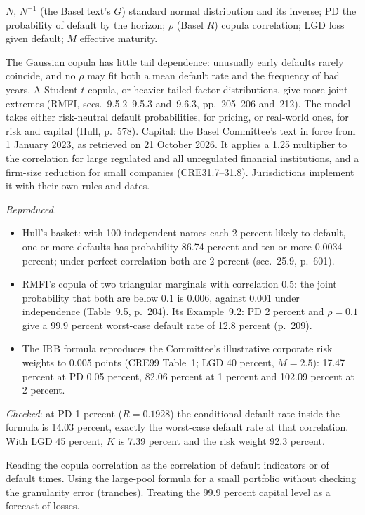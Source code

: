 \begin{qfmodel}
 $N$, $N^{-1}$ (the Basel text's $G$) standard normal distribution and its inverse; PD the probability of default by the horizon; $\rho$ (Basel $R$) copula correlation; LGD loss given default; $M$ effective maturity.

 The Gaussian copula has little tail dependence: unusually early defaults rarely coincide, and no $\rho$ may fit both a mean default rate and the frequency of bad years. A Student $t$ copula, or heavier-tailed factor distributions, give more joint extremes (RMFI, secs.~9.5.2--9.5.3 and~9.6.3, pp.~205--206 and~212). The model takes either risk-neutral default probabilities, for pricing, or real-world ones, for risk and capital (Hull, p.~578). Capital: the Basel Committee's text in force from 1 January 2023, as retrieved on 21 October 2026. It applies a 1.25 multiplier to the correlation for large regulated and all unregulated financial institutions, and a firm-size reduction for small companies (CRE31.7--31.8). Jurisdictions implement it with their own rules and dates.

 \emph{Reproduced.}
\begin{itemize}
\item Hull's basket: with 100 independent names each 2 percent likely to default, one or more defaults has probability 86.74 percent and ten or more 0.0034 percent; under perfect correlation both are 2 percent (sec.~25.9, p.~601).
\item RMFI's copula of two triangular marginals with correlation 0.5: the joint probability that both are below 0.1 is 0.006, against 0.001 under independence (Table~9.5, p.~204). Its Example~9.2: PD 2 percent and $\rho=0.1$ give a 99.9 percent worst-case default rate of 12.8 percent (p.~209).
\item The IRB formula reproduces the Committee's illustrative corporate risk weights to 0.005 points (CRE99 Table~1; LGD 40 percent, $M=2.5$): 17.47 percent at PD 0.05 percent, 82.06 percent at 1 percent and 102.09 percent at 2 percent.
\end{itemize}
\emph{Checked}: at PD 1 percent ($R=0.1928$) the conditional default rate inside the formula is 14.03 percent, exactly the worst-case default rate at that correlation. With LGD 45 percent, $K$ is 7.39 percent and the risk weight 92.3 percent.

 Reading the copula correlation as the correlation of default indicators or of default times. Using the large-pool formula for a small portfolio without checking the granularity error (\hyperref[meth:tranche-loss-base-correlation]{tranches}). Treating the 99.9 percent capital level as a forecast of losses.


\end{qfmodel}
